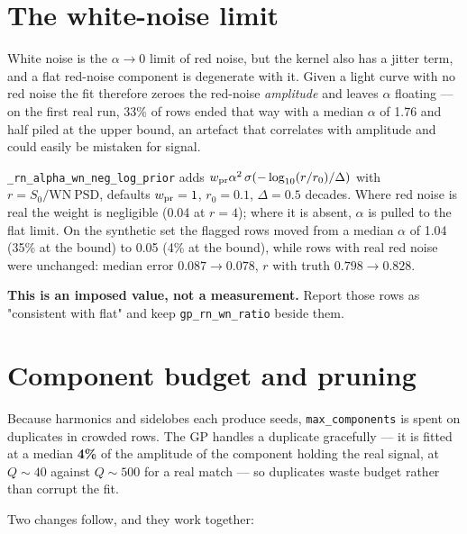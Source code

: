 \documentclass[11pt]{article}
\newcommand{\code}[1]{\texttt{#1}}
\begin{document}
\section{The white-noise limit}

White noise is the $\alpha \to 0$ limit of red noise, but the kernel also has a jitter term,
and a flat red-noise component is degenerate with it. Given a light curve with no red noise
the fit therefore zeroes the red-noise \emph{amplitude} and leaves $\alpha$ floating --- on the
first real run, 33\% of rows ended that way with a median $\alpha$ of 1.76 and half piled at
the upper bound, an artefact that correlates with amplitude and could easily be mistaken for
signal.

\code{\_rn\_alpha\_wn\_neg\_log\_prior} adds $w_{\rm pr}\alpha^2\,\sigma(-\log_{10}(r/r_0)/\Delta)$
with $r = S_0 / \mathrm{WN\ PSD}$, defaults $w_{\rm pr}=1$, $r_0 = 0.1$, $\Delta = 0.5$
decades. Where red noise is real the weight is negligible (0.04 at $r=4$); where it is
absent, $\alpha$ is pulled to the flat limit. On the synthetic set the flagged rows moved
from a median $\alpha$ of 1.04 (35\% at the bound) to 0.05 (4\% at the bound), while rows with
real red noise were unchanged: median error $0.087 \to 0.078$, $r$ with truth
$0.798 \to 0.828$.

\textbf{This is an imposed value, not a measurement.} Report those rows as "consistent with
flat" and keep \code{gp\_rn\_wn\_ratio} beside them.

\section{Component budget and pruning}

Because harmonics and sidelobes each produce seeds, \code{max\_components} is spent on
duplicates in crowded rows. The GP handles a duplicate gracefully --- it is fitted at a median
\textbf{4\%} of the amplitude of the component holding the real signal, at $Q \sim 40$ against
$Q \sim 500$ for a real match --- so duplicates waste budget rather than corrupt the fit.

Two changes follow, and they work together:
\end{document}
